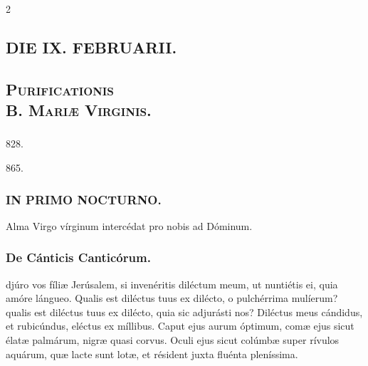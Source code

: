 \documentclass[9pt,twoside]{extarticle}
\begin{document}
\begin{multicols}{2}
\subsection*{\center \textsc{DIE IX. FEBRUARII.}}
\subsubsection*{\center {}}
\subsection*{\center \textsc{Purificationis\\ B. Mariæ Virginis.}}
\subsubsection*{\center {}}
\begin{tightlist}{}
\item {} 828. 
\item {} 865. 
\end{tightlist}

\subsubsection*{\center \textsc{IN PRIMO NOCTURNO.}}
\begin{tightlist}{}
\item {\small {} Alma Virgo vírginum intercédat pro nobis ad Dóminum.}
\end{tightlist}
\subsubsection*{\center De Cánticis Canticórum.}
\begin{center}\end{center}
djúro vos fíliæ Jerúsalem, si invenéritis diléctum meum, ut nuntiétis ei, quia amóre lángueo. Qualis est diléctus tuus ex dilécto, o pulchérrima mulíerum? qualis est diléctus tuus ex dilécto, quia sic adjurásti nos? Diléctus meus cándidus, et rubicúndus, eléctus ex míllibus. Caput ejus aurum óptimum, comæ ejus sicut élatæ palmárum, nigræ quasi corvus. Oculi ejus sicut colúmbæ super rívulos aquárum, quæ lacte sunt lotæ, et résident juxta fluénta pleníssima.


\end{multicols}
\end{document}
